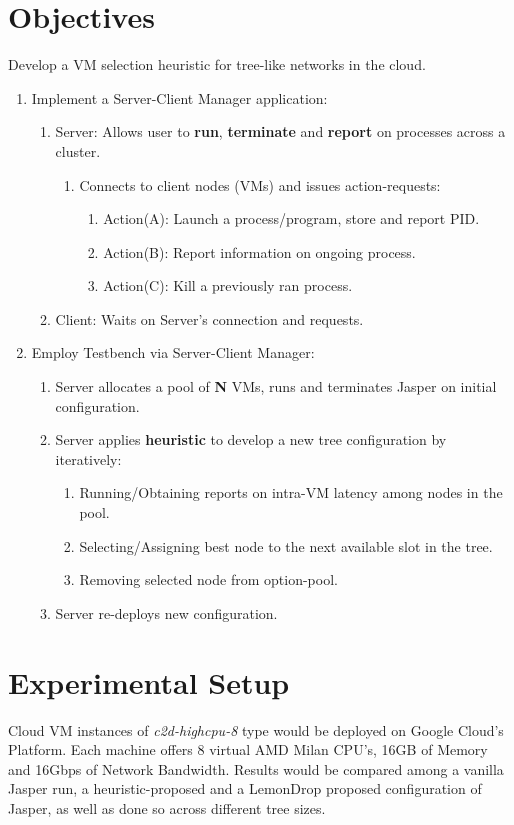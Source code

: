 \documentclass{article}
\begin{document}
\section{Objectives}
Develop a VM selection heuristic for tree-like networks in the cloud.
\begin{enumerate}
    \item Implement a Server-Client Manager application:
    \begin{enumerate}
        \item Server: Allows user to \textbf{run}, \textbf{terminate} and \textbf{report} on processes across a cluster.        
        \begin{enumerate}
            \item Connects to client nodes (VMs) and issues action-requests:
            \begin{enumerate}
                \item Action(A): Launch a process/program, store and report PID.
                \item Action(B): Report information on ongoing process.
                \item Action(C): Kill a previously ran process.
            \end{enumerate}
        \end{enumerate}
        \item Client: Waits on Server's connection and requests.
    \end{enumerate}
    \item Employ Testbench via Server-Client Manager:
    \begin{enumerate}
        \item Server allocates a pool of \textbf{N} VMs, runs and terminates Jasper on initial configuration.
        \item Server applies \textbf{heuristic} to develop a new tree configuration by iteratively:
            \begin{enumerate}
                \item Running/Obtaining reports on intra-VM latency among nodes in the pool.
                \item Selecting/Assigning best node to the next available slot in the tree.
                \item Removing selected node from option-pool.
            \end{enumerate}
        \item Server re-deploys new configuration.
    \end{enumerate}
\end{enumerate}

\section{Experimental Setup}
Cloud VM instances of \textit{c2d-highcpu-8} type would be deployed on Google Cloud's Platform. 
Each machine offers 8 virtual AMD Milan CPU's, 16GB of Memory and 16Gbps of Network Bandwidth. 
Results would be compared among a vanilla Jasper run, a heuristic-proposed 
and a LemonDrop proposed configuration of Jasper, as well as done so across different tree sizes.


    
\end{document}
